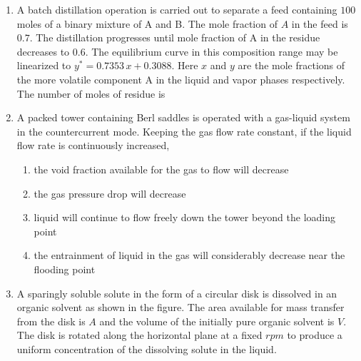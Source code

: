\documentclass[journal,12pt,onecolumn]{IEEEtran}
\theoremstyle{remark}
\begin{document}
\begin{enumerate}
\item A batch distillation operation is carried out to separate a feed containing $100$ moles of a binary mixture of A and B. The mole fraction of $A$ in the feed is $0.7$. The distillation progresses until mole fraction of A in the residue decreases to $0.6$. The equilibrium curve in this composition range may be linearized to $y^* = 0.7353 \, x + 0.3088$. Here $x$ and $y$ are the mole fractions of the more volatile component A in the liquid and vapor phases respectively. The number of moles of residue is
\hfill{}
\begin{enumerate}
\end{enumerate}

\item A packed tower containing Berl saddles is operated with a gas-liquid system in the countercurrent mode. Keeping the gas flow rate constant, if the liquid flow rate is continuously increased,
\hfill{}
\begin{enumerate}
\item the void fraction available for the gas to flow will decrease
\item the gas pressure drop will decrease
\item liquid will continue to flow freely down the tower beyond the loading point
\item the entrainment of liquid in the gas will considerably decrease near the flooding point
\end{enumerate}

\item A sparingly soluble solute in the form of a circular disk is dissolved in an organic solvent as shown in the figure. The area available for mass transfer from the disk is $A$ and the volume of the initially pure organic solvent is $V$. The disk is rotated along the horizontal plane at a fixed $rpm$ to produce a uniform concentration of the dissolving solute in the liquid.


\end{enumerate}
\end{document}
